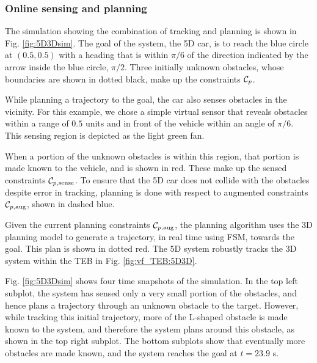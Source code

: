 
\subsubsection{Online sensing and planning}
The simulation showing the combination of tracking and planning is shown in Fig. \ref{fig:5D3Dsim}.
The goal of the system, the 5D car, is to reach the blue circle at $(0.5, 0.5)$ with a heading that is within $\pi/6$ of the direction indicated by the arrow inside the blue circle, $\pi/2$.
Three initially unknown obstacles, whose boundaries are shown in dotted black, make up the constraints $\mathcal C_p$.

While planning a trajectory to the goal, the car also senses obstacles in the vicinity.
For this example, we chose a simple virtual sensor that reveals obstacles within a range of $0.5$ units and in front of the vehicle within an angle of $\pi/6$.
This sensing region is depicted as the light green fan.

When a portion of the unknown obstacles is within this region, that portion is made known to the vehicle, and is shown in red.
These make up the sensed constraints $\mathcal C_{p,\text{sense}}$.
To ensure that the 5D car does not collide with the obstacles despite error in tracking, planning is done with respect to augmented constraints $\mathcal C_{p,\text{aug}}$, shown in dashed blue.

Given the current planning constraints $\mathcal C_{p,\text{aug}}$, the planning algorithm uses the 3D planning model to generate a trajectory, in real time using FSM, towards the goal.
This plan is shown in dotted red.
The 5D system robustly tracks the 3D system within the TEB in Fig. \ref{fig:vf_TEB:5D3D}.

Fig. \ref{fig:5D3Dsim} shows four time snapshots of the simulation.
In the top left subplot, the system has sensed only a very small portion of the obstacles, and hence plans a trajectory through an unknown obstacle to the target.
However, while tracking this initial trajectory, more of the L-shaped obstacle is made known to the system, and therefore the system plans around this obstacle, as shown in the top right subplot.
The bottom subplots show that eventually more obstacles are made known, and the system reaches the goal at $t=23.9$ s.

